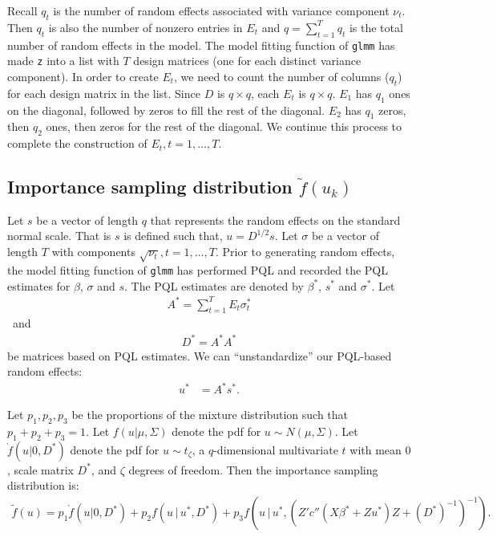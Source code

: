 \documentclass{article}
\begin{document}
Recall $q_t$ is the number of random effects associated with variance component $\nu_t$. Then $q_t$ is also the number of nonzero entries in $E_t$ and $q=\sum_{t=1}^T q_t$ is the total number of random effects in the model.  
The model fitting function of \texttt{glmm} has made  \texttt{z} into a list with $T$ design matrices (one for each distinct variance component).  In order to create $E_t$, we need to  count the  number of columns ($q_t$) for each design matrix in the list.
Since $D$  is $q \times q$, each $E_t$  is $q \times q$.   $E_1$ has $q_1$ ones on the diagonal, followed by zeros to fill the rest of the diagonal.  $E_2$ has $q_1$ zeros, then $q_2$ ones, then zeros for the rest of the diagonal. We continue this process to complete the construction of $E_t, t=1,\ldots, T$.

\subsection{Importance sampling distribution $\tilde{f}(u_k)$}\label{sec:ftwiddle}
 Let $s$ be a vector of length $q$ that represents the random effects on the standard normal scale. That is $s$ is defined such that, $u= D^{1/2}s$. Let $\sigma$ be a vector of length $T$ with components $\sqrt{\nu_t},t=1,\ldots,T$.  Prior to generating random effects, the model fitting function of \texttt{glmm} has performed PQL and recorded the PQL estimates for $\beta$, $\sigma$ and  $s$. The PQL estimates are denoted by $\beta^*$, $s^*$ and $\sigma^*$. Let
\begin{align}
A^*=\sum_{t=1}^T E_t \sigma^*_t
\end{align}\
and
\begin{align}
 D^* =A^*A^*
\end{align}
be matrices based on PQL estimates. We can ``unstandardize'' our PQL-based random effects:
\begin{align}
u^*&=A^*s^*.
\end{align}


Let $p_1,p_2,p_3$ be the proportions of the mixture distribution such that  $p_1+p_2+p_3=1$.  Let $f(u|\mu,\Sigma)$ denote the pdf for $u \sim N(\mu,\Sigma)$.  Let $\grave{f}(u|0,D^*)$ denote the pdf for $u \sim t_\zeta$, a $q$-dimensional multivariate  $t$ with mean $0$, scale matrix $D^*$, and $\zeta$ degrees of freedom. Then the importance sampling distribution is:
\begin{align}
 \tilde{f}(u) = p_1  \grave{f}(u|0,D^*)+p_2  f(u \, | \, u^*, D^*)+p_3  f(u \, | \, u^*, (Z'  c''(X \beta^*+Zu^*) Z +(D^*)^{-1}   )^{-1}). \label{eq:ftwiddle}
\end{align}
\end{document}
